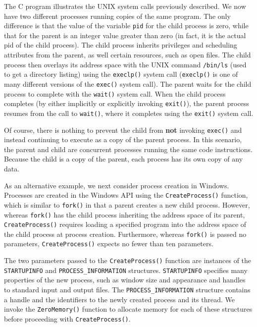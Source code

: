 The C program illustrates the UNIX system calls previously described. We now have two different processes running copies of the same program. The only difference is that the value of the variable \texttt{pid} for the child process is zero, while that for the parent is an integer value greater than zero (in fact, it is the actual pid of the child process). The child process inherits privileges and scheduling attributes from the parent, as well certain resources, such as open files. The child process then overlays its address space with the UNIX command \texttt{/bin/ls} (used to get a directory listing) using the \texttt{execlp()} system call (\texttt{execlp()} is one of many different versions of the \texttt{exec()} system call). The parent waits for the child process to complete with the \texttt{wait()} system call. When the child process completes (by either implicitly or explicitly invoking \texttt{exit()}), the parent process resumes from the call to \texttt{wait()}, where it completes using the \texttt{exit()} system call.

Of course, there is nothing to prevent the child from \textbf{not} invoking \texttt{exec()} and instead continuing to execute as a copy of the parent process. In this scenario, the parent and child are concurrent processes running the same code instructions. Because the child is a copy of the parent, each process has its own copy of any data.

As an alternative example, we next consider process creation in Windows. Processes are created in the Windows API using the \texttt{CreateProcess()} function, which is similar to \texttt{fork()} in that a parent creates a new child process. However, whereas \texttt{fork()} has the child process inheriting the address space of its parent, \texttt{CreateProcess()} requires loading a specified program into the address space of the child process at process creation. Furthermore, whereas \texttt{fork()} is passed no parameters, \texttt{CreateProcess()} expects no fewer than ten parameters.

The two parameters passed to the \texttt{CreateProcess()} function are instances of the \texttt{STARTUPINFO} and \texttt{PROCESS\_INFORMATION} structures. \texttt{STARTUPINFO} specifies many properties of the new process, such as window size and appearance and handles to standard input and output files. The \texttt{PROCESS\_INFORMATION} structure contains a handle and the identifiers to the newly created process and its thread. We invoke the \texttt{ZeroMemory()} function to allocate memory for each of these structures before proceeding with \texttt{CreateProcess()}.


